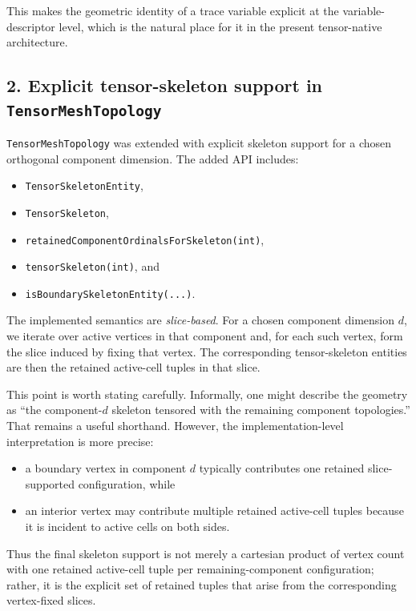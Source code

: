 \documentclass[11pt]{article}
\begin{document}
This makes the geometric identity of a trace variable explicit at the variable-descriptor level, which is the natural place for it in the present tensor-native architecture.

\subsection{2. Explicit tensor-skeleton support in \texttt{TensorMeshTopology}}

\texttt{TensorMeshTopology} was extended with explicit skeleton support for a chosen orthogonal component dimension. The added API includes:
\begin{itemize}[leftmargin=2em]
  \item \texttt{TensorSkeletonEntity},
  \item \texttt{TensorSkeleton},
  \item \texttt{retainedComponentOrdinalsForSkeleton(int)},
  \item \texttt{tensorSkeleton(int)}, and
  \item \texttt{isBoundarySkeletonEntity(...)}.
\end{itemize}

The implemented semantics are \emph{slice-based}. For a chosen component dimension $d$, we iterate over active vertices in that component and, for each such vertex, form the slice induced by fixing that vertex. The corresponding tensor-skeleton entities are then the retained active-cell tuples in that slice.

This point is worth stating carefully. Informally, one might describe the geometry as ``the component-$d$ skeleton tensored with the remaining component topologies.'' That remains a useful shorthand. However, the implementation-level interpretation is more precise:
\begin{itemize}[leftmargin=2em]
  \item a boundary vertex in component $d$ typically contributes one retained slice-supported configuration, while
  \item an interior vertex may contribute multiple retained active-cell tuples because it is incident to active cells on both sides.
\end{itemize}

Thus the final skeleton support is not merely a cartesian product of vertex count with one retained active-cell tuple per remaining-component configuration; rather, it is the explicit set of retained tuples that arise from the corresponding vertex-fixed slices.
\end{document}

